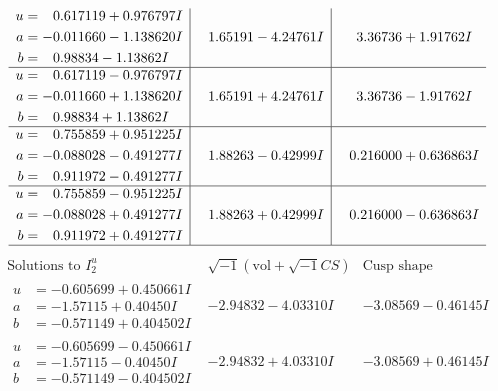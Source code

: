 \documentclass[1p]{elsarticle_modified}
\theoremstyle{definition}
\newcommand{\I}{\sqrt{-1}}
\begin{document}
$$\begin{array}{c|c|c}
\begin{aligned}
u &= \phantom{-}0.617119 + 0.976797 I \\
a &= -0.011660 - 1.138620 I \\
b &= \phantom{-}0.98834 - 1.13862 I\end{aligned}
 & \phantom{-}1.65191 - 4.24761 I & \phantom{-}3.36736 + 1.91762 I \\ \hline\begin{aligned}
u &= \phantom{-}0.617119 - 0.976797 I \\
a &= -0.011660 + 1.138620 I \\
b &= \phantom{-}0.98834 + 1.13862 I\end{aligned}
 & \phantom{-}1.65191 + 4.24761 I & \phantom{-}3.36736 - 1.91762 I \\ \hline\begin{aligned}
u &= \phantom{-}0.755859 + 0.951225 I \\
a &= -0.088028 - 0.491277 I \\
b &= \phantom{-}0.911972 - 0.491277 I\end{aligned}
 & \phantom{-}1.88263 - 0.42999 I & \phantom{-}0.216000 + 0.636863 I \\ \hline\begin{aligned}
u &= \phantom{-}0.755859 - 0.951225 I \\
a &= -0.088028 + 0.491277 I \\
b &= \phantom{-}0.911972 + 0.491277 I\end{aligned}
 & \phantom{-}1.88263 + 0.42999 I & \phantom{-}0.216000 - 0.636863 I\\
 \hline 
 \end{array}$$\newpage$$\begin{array}{c|c|c}  
\text{Solutions to }I^u_{2}& \I (\text{vol} + \sqrt{-1}CS) & \text{Cusp shape}\\
 \hline 
\begin{aligned}
u &= -0.605699 + 0.450661 I \\
a &= -1.57115 + 0.40450 I \\
b &= -0.571149 + 0.404502 I\end{aligned}
 & -2.94832 - 4.03310 I & -3.08569 - 0.46145 I \\ \hline\begin{aligned}
u &= -0.605699 - 0.450661 I \\
a &= -1.57115 - 0.40450 I \\
b &= -0.571149 - 0.404502 I\end{aligned}
 & -2.94832 + 4.03310 I & -3.08569 + 0.46145 I \\ \hline\begin{aligned}

\end{aligned}
\end{array}$$
\end{document}

